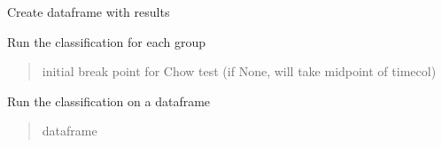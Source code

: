 \documentclass[letterpaper,10pt,english]{sphinxmanual}
\begin{document}
\begin{fulllineitems}
\begin{fulllineitems}
\label{\detokenize{source/chowclassifier:chowclassifier.chow.ChewData.results_df}}
\pysigstartsignatures
{}
\pysigstopsignatures
\sphinxAtStartPar
Create dataframe with results

\end{fulllineitems}


\begin{fulllineitems}
\label{\detokenize{source/chowclassifier:chowclassifier.chow.ChewData.run}}
\pysigstartsignatures
{}
\pysigstopsignatures
\sphinxAtStartPar
Run the classification for each group
\begin{quote}\begin{description}
\sphinxAtStartPar
initial break point for Chow test (if None, will take midpoint of timecol)

\end{description}\end{quote}

\end{fulllineitems}


\begin{fulllineitems}
\label{\detokenize{source/chowclassifier:chowclassifier.chow.ChewData.run_C}}
\pysigstartsignatures
{}
\pysigstopsignatures
\sphinxAtStartPar
Run the classification on a dataframe
\begin{quote}\begin{description}
\sphinxAtStartPar
dataframe


\end{description}
\end{quote}
\end{fulllineitems}
\end{fulllineitems}
\end{document}
